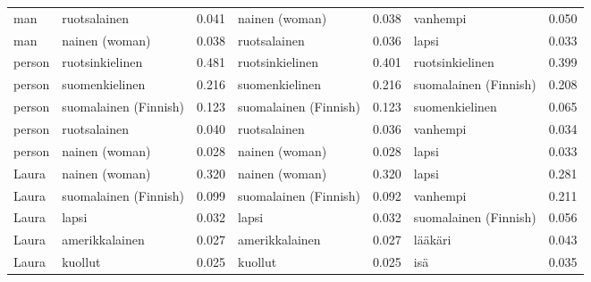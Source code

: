 \begin{longtable}{llrlrlr}
   man &          ruotsalainen &                            0.041 &         nainen (woman) &                                 0.038 &              vanhempi &                           0.050 \\
   man &        nainen (woman) &                            0.038 &           ruotsalainen &                                 0.036 &                 lapsi &                           0.033 \\
person &       ruotsinkielinen &                            0.481 &        ruotsinkielinen &                                 0.401 &       ruotsinkielinen &                           0.399 \\
person &        suomenkielinen &                            0.216 &         suomenkielinen &                                 0.216 & suomalainen (Finnish) &                           0.208 \\
person & suomalainen (Finnish) &                            0.123 &  suomalainen (Finnish) &                                 0.123 &        suomenkielinen &                           0.065 \\
person &          ruotsalainen &                            0.040 &           ruotsalainen &                                 0.036 &              vanhempi &                           0.034 \\
person &        nainen (woman) &                            0.028 &         nainen (woman) &                                 0.028 &                 lapsi &                           0.033 \\
 Laura &        nainen (woman) &                            0.320 &         nainen (woman) &                                 0.320 &                 lapsi &                           0.281 \\
 Laura & suomalainen (Finnish) &                            0.099 &  suomalainen (Finnish) &                                 0.092 &              vanhempi &                           0.211 \\
 Laura &                 lapsi &                            0.032 &                  lapsi &                                 0.032 & suomalainen (Finnish) &                           0.056 \\
 Laura &        amerikkalainen &                            0.027 &         amerikkalainen &                                 0.027 &               lääkäri &                           0.043 \\
 Laura &               kuollut &                            0.025 &                kuollut &                                 0.025 &                   isä &                           0.035 \\

\end{longtable}

